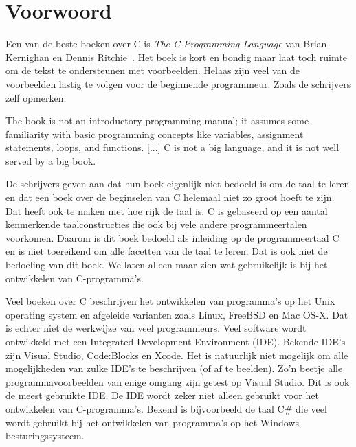

\chapter{Voorwoord}
\label{cha:voorwoord}
\thispagestyle{empty}

Een van de beste boeken over C is \textsl{The C Programming Language} van Brian Kernighan en Dennis Ritchie~\cite{kernighan1988c}. Het boek is kort en bondig maar laat toch ruimte om de tekst te ondersteunen met voorbeelden. Helaas zijn veel van de voorbeelden lastig te volgen voor de beginnende programmeur. Zoals de schrijvers zelf opmerken:

\begin{displayquote}
The book is not an introductory programming manual; it assumes some familiarity
with basic programming concepts like variables, assignment statements,
loops, and functions.
[...]
C is not a big language, and it is not well served by a big book.
\end{displayquote}

De schrijvers geven aan dat hun boek eigenlijk niet bedoeld is om de taal te leren
en dat een boek over de beginselen van C helemaal niet zo groot hoeft te zijn.
Dat heeft ook te maken met hoe rijk de taal is. C is gebaseerd op een aantal
kenmerkende taalconstructies die ook bij vele andere programmeertalen voorkomen.
Daarom is dit boek bedoeld als inleiding op de programmeertaal C en is niet
toereikend om alle facetten van de taal te leren. Dat is ook niet de
bedoeling van dit boek. We laten alleen maar zien wat gebruikelijk is bij
het ontwikkelen van C-programma's. 

Veel boeken over C beschrijven het ontwikkelen van programma's op het Unix
operating system en afgeleide varianten zoals Linux, FreeBSD en Mac OS-X.
Dat is echter niet de werkwijze van veel programmeurs. Veel software wordt
ontwikkeld met een Integrated Development Environment (IDE). Bekende IDE's
zijn Visual Studio, Code:Blocks en Xcode. Het is natuurlijk niet mogelijk
om alle mogelijkheden van zulke IDE's te beschrijven (of af te beelden).
Zo'n beetje alle programmavoorbeelden van enige omgang zijn getest op
Visual Studio. Dit is ook de meest gebruikte IDE. De IDE wordt zeker niet
alleen gebruikt voor het ontwikkelen van C-programma's. Bekend is bijvoorbeeld
de taal C\# die veel wordt gebruikt bij het ontwikkelen van programma's op
het Windows-besturingssysteem.

